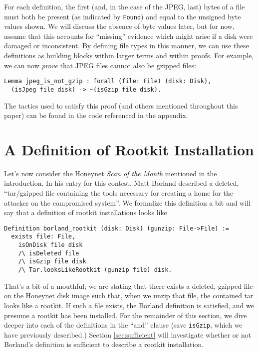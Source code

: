 \documentclass[nocopyrightspace]{sigplanconf}
\begin{document}
For each definition, the first (and, in the case of the JPEG, last) bytes of a
file must both be present (as indicated by {\tt Found}) and equal to the
unsigned byte values shown. We will discuss the absence of byte values later,
but for now, assume that this accounts for ``missing'' evidence which might
arise if a disk were damaged or inconsistent. By defining file types in this
manner, we can use these definitions as building blocks within larger terms
and within proofs. For example, we can now {\it prove} that JPEG files cannot
also be gzipped files:

\begin{lstlisting}
Lemma jpeg_is_not_gzip : forall (file: File) (disk: Disk),
  (isJpeg file disk) -> ~(isGzip file disk).
\end{lstlisting}

The tactics used to satisfy this proof (and others mentioned throughout this
paper) can be found in the code referenced in the appendix.

\section{A Definition of Rootkit Installation}

Let's now consider the Honeynet {\it Scan of the Month} mentioned in the
introduction. In his entry for this contest, Matt 
Borland\cite{borland-honeynet} described a deleted, ``tar/gzipped file
containing the tools necessary for creating a home for the attacker on the
compromised system''. We formalize this definition a bit and will say that a
definition of rootkit installations looks like

\begin{lstlisting}
Definition borland_rootkit (disk: Disk) (gunzip: File->File) :=
  exists file: File,
    isOnDisk file disk
    /\ isDeleted file
    /\ isGzip file disk
    /\ Tar.looksLikeRootkit (gunzip file) disk.
\end{lstlisting}

That's a bit of a mouthful; we are stating that there exists a deleted,
gzipped file on the Honeynet disk image such that, when we unzip that file,
the contained tar looks like a rootkit. If such a file exists, the Borland
definition is satisfied, and we presume a rootkit has been installed. For the
remainder of this section, we dive deeper into each of the definitions in the
``and'' clause (save {\tt isGzip}, which we have previously described.)
Section \ref{sec:sufficient} will investigate whether or not Borland's
definition is sufficient to describe a rootkit installation.
\end{document}
